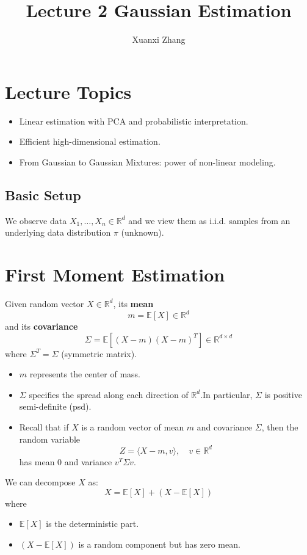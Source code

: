 \documentclass{article}
\title{Lecture 2 Gaussian Estimation}
\author{Xuanxi Zhang}
\date{}
\begin{document}
\maketitle

\section{Lecture Topics}
\begin{itemize}
    \item Linear estimation with PCA and probabilistic interpretation.
    \item Efficient high-dimensional estimation.
    \item From Gaussian to Gaussian Mixtures: power of non-linear modeling.
\end{itemize}

\subsection*{Basic Setup}
We observe data \( X_1, \dots, X_n \in \mathbb{R}^d \) and we view them as i.i.d. samples from an underlying data distribution \( \pi \) (unknown).

\section{First Moment Estimation}
Given random vector \( X \in \mathbb{R}^d \),
its \textbf{mean} 
\[
m = \mathbb{E}[X] \in \mathbb{R}^d
\]
and its \textbf{covariance} 
\[
\Sigma = \mathbb{E} \left[ (X - m)(X - m)^T \right] \in \mathbb{R}^{d \times d}
\]
where \( \Sigma^T = \Sigma \) (symmetric matrix).

\begin{itemize}
    \item \( m \) represents the center of mass.
    \item \( \Sigma \) specifies the spread along each direction of \( \mathbb{R}^d \).In particular, \( \Sigma \) is positive semi-definite (psd).
    \item Recall that if \( X \) is a random vector of mean \( m \) and covariance \( \Sigma \), then the random variable
    \[
    Z = \langle X - m, v \rangle, \quad v \in \mathbb{R}^d
    \]
    has mean \( 0 \) and variance \( v^T \Sigma v \).
\end{itemize}

We can decompose \( X \) as:
\[
X = \mathbb{E}[X] + (X - \mathbb{E}[X])
\]
where
\begin{itemize}
    \item \( \mathbb{E}[X] \) is the deterministic part.
    \item \( (X - \mathbb{E}[X]) \) is a random component but has zero mean.
\end{itemize}
\end{document}
